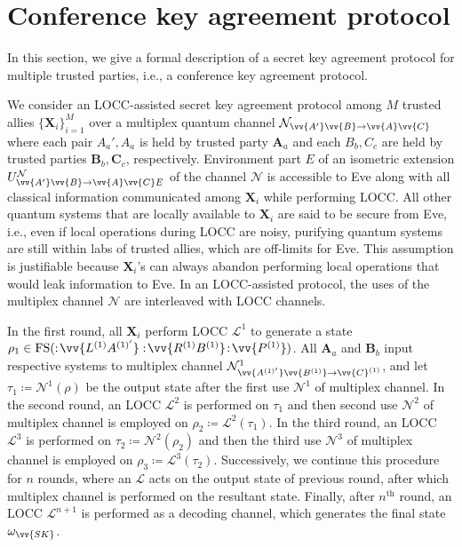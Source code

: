 \documentclass[aps,pra,twocolumn,superscriptaddress,longbibliography]{revtex4-1}
\def\FS{\operatorname{FS}}
\newcommand{\mc}[1]{\mathcal{#1}}
\newcommand{\tf}[1]{\textbf{#1}}
\begin{document}
\section{Conference key agreement protocol}\label{sec:cka}
In this section, we give a formal description of a secret key agreement protocol for multiple trusted parties, i.e., a conference key agreement protocol. 

We consider an LOCC-assisted secret key agreement protocol among $M$ trusted allies $\{\tf{X}_i\}_{i=1}^M$ over a multiplex quantum channel $\mc{N}_{\vv{A'}\vv{B}\to\vv{A}\vv{C}}$ where each pair $A_a', A_a$ is held by trusted party $\tf{A}_a$ and each $B_b,C_c$ are held by trusted parties $\tf{B}_b,\tf{C}_c$, respectively. Environment part $E$ of an isometric extension $U^\mc{N}_{\vv{A'}\vv{B}\to\vv{A}\vv{C}E}$ of the channel $\mc{N}$ is accessible to Eve along with all classical information communicated among $\tf{X}_i$ while performing LOCC. All other quantum systems that are locally available to $\tf{X}_i$ are said to be secure from Eve, i.e., even if local operations during LOCC are noisy, purifying quantum systems are still within labs of trusted allies, which are off-limits for Eve. This assumption is justifiable because $\tf{X}_i$'s can always abandon performing local operations that would leak information to Eve. 
In an LOCC-assisted protocol, the uses of the multiplex channel $\mc{N}$ are interleaved with LOCC channels. 

In the first round, all $\tf{X}_i$ perform LOCC $\mc{L}^1$ to generate a state $\rho_1\in\FS(:\!\vv{L^{(1)}A^{(1)'}}:\!\vv{R^{(1)}B^{(1)}}\!:\!\vv{P^{(1)}})$. All $\tf{A}_a$ and $\tf{B}_b$ input respective systems to multiplex channel $\mc{N}^1_{\vv{A^{(1)'}}\vv{B^{(1)}}\to \vv{C}^{(1)}}$, and let $\tau_1\coloneqq \mc{N}^1(\rho)$ be the output state after the first use $\mc{N}^{1}$ of multiplex channel. In the second round, an LOCC $\mc{L}^{2}$ is performed on $\tau_1$ and then second use $\mc{N}^{2}$ of multiplex channel is employed on $\rho_2\coloneqq \mc{L}^{2}(\tau_1)$. In the third round, an LOCC $\mc{L}^{3}$ is performed on $\tau_2\coloneqq \mc{N}^2(\rho_2)$ and then the third use $\mc{N}^{3}$ of multiplex channel is employed on $\rho_3\coloneqq \mc{L}^{3}(\tau_2)$. Successively, we continue this procedure for $n$ rounds, where an $\mc{L}$ acts on the output state of previous round, after which multiplex channel is performed on the resultant state. Finally, after $n^{\text{th}}$ round, an LOCC $\mc{L}^{n+1}$ is performed as a decoding channel, which generates the final state $\omega_{\vv{SK}}$.
\end{document}
